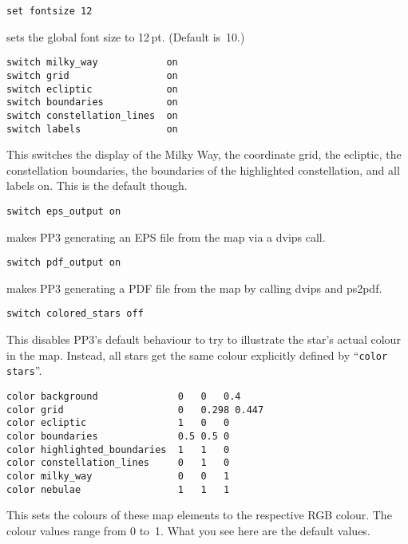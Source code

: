 \documentclass{article}
\newcommand{\subskip}{\vspace{\subskipamount}\pagebreak[3]}
\begin{document}
\begin{multicols*}{3}
\begin{lstlisting}
set fontsize 12
\end{lstlisting}
sets the global font size to 12\,pt.  (Default is~10.)\subskip

\begin{lstlisting}
switch milky_way            on
switch grid                 on
switch ecliptic             on
switch boundaries           on
switch constellation_lines  on
switch labels               on
\end{lstlisting}
This switches the display of the Milky Way, the coordinate grid, the ecliptic,
the constellation boundaries, the boundaries of the highlighted constellation,
and all labels on.  This is the default though.\vspace{\bigskipamount}\pagebreak[2]

\begin{lstlisting}
switch eps_output on
\end{lstlisting}
makes PP3 generating an EPS file from the map via a dvips call.\vspace{\bigskipamount}\pagebreak[2]

\begin{lstlisting}
switch pdf_output on
\end{lstlisting}
makes PP3 generating a PDF file from the map by calling dvips and
ps2pdf.\vspace{\bigskipamount}\pagebreak[2]


\begin{lstlisting}
switch colored_stars off
\end{lstlisting}
This disables PP3's default behaviour to try to illustrate the star's
actual colour in the map.  Instead, all stars get the same colour explicitly
defined by ``\lstinline{color stars}''.\subskip

\begin{lstlisting}
color background              0   0   0.4
color grid                    0   0.298 0.447
color ecliptic                1   0   0
color boundaries              0.5 0.5 0
color highlighted_boundaries  1   1   0
color constellation_lines     0   1   0
color milky_way               0   0   1
color nebulae                 1   1   1
\end{lstlisting}
This sets the colours of these map elements to the respective RGB colour.
The colour values range from 0 to~1.  What you see here are the default
values.

\end{multicols*}
\end{document}
